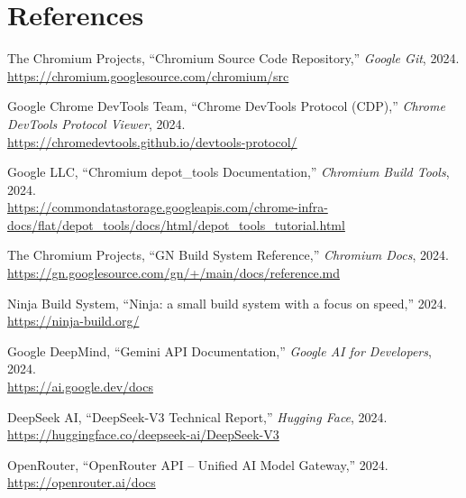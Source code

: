 \chapter*{References}

\begin{enumerate}[leftmargin=*, label={[\arabic*]}]

    \item The Chromium Projects, ``Chromium Source Code Repository,'' \textit{Google Git}, 2024.\\
          \url{https://chromium.googlesource.com/chromium/src}

    \item Google Chrome DevTools Team, ``Chrome DevTools Protocol (CDP),'' \textit{Chrome DevTools Protocol Viewer}, 2024.\\
          \url{https://chromedevtools.github.io/devtools-protocol/}

    \item Google LLC, ``Chromium depot\_tools Documentation,'' \textit{Chromium Build Tools}, 2024.\\
          \url{https://commondatastorage.googleapis.com/chrome-infra-docs/flat/depot_tools/docs/html/depot_tools_tutorial.html}

    \item The Chromium Projects, ``GN Build System Reference,'' \textit{Chromium Docs}, 2024.\\
          \url{https://gn.googlesource.com/gn/+/main/docs/reference.md}

    \item Ninja Build System, ``Ninja: a small build system with a focus on speed,'' 2024.\\
          \url{https://ninja-build.org/}

    \item Google DeepMind, ``Gemini API Documentation,'' \textit{Google AI for Developers}, 2024.\\
          \url{https://ai.google.dev/docs}

    \item DeepSeek AI, ``DeepSeek-V3 Technical Report,'' \textit{Hugging Face}, 2024.\\
          \url{https://huggingface.co/deepseek-ai/DeepSeek-V3}

    \item OpenRouter, ``OpenRouter API -- Unified AI Model Gateway,'' 2024.\\
          \url{https://openrouter.ai/docs}


\end{enumerate}
